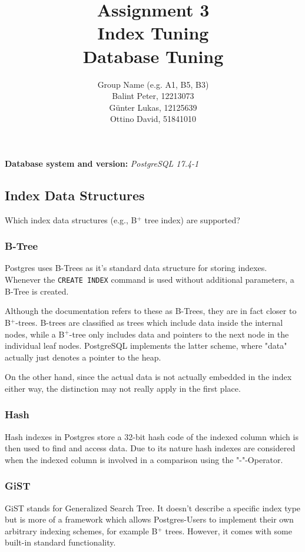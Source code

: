 \documentclass[11pt]{scrartcl}
\title{
  \textbf{\large Assignment 3} \\
  Index Tuning \\
  {\large Database Tuning}}
\author{
  Group Name (e.g. A1, B5, B3) \\
  \large Balint Peter, 12213073 \\
  \large Günter Lukas, 12125639 \\
  \large Ottino David, 51841010
}
\begin{document}
\maketitle

\textbf{Database system and version:} \emph{PostgreSQL 17.4-1}

\subsection{Index Data Structures}

Which index data structures (e.g., B$^+$ tree index) are supported?

\subsubsection{B-Tree}
Postgres uses B-Trees as it's standard data structure for storing indexes. Whenever the \texttt{CREATE INDEX} command is used without additional parameters, a B-Tree is created.

Although the documentation refers to these as B-Trees, they are in fact closer to B$^+$-trees. B-trees are classified as trees which include data inside the internal nodes, while a B$^+$-tree only includes data and pointers to the next node in the individual leaf nodes.  PostgreSQL implements the latter scheme, where "data" actually just denotes a pointer to the heap.

On the other hand, since the actual data is not actually embedded in the index either way, the distinction may not really apply in the first place. 

\subsubsection{Hash}
Hash indexes in Postgres store a 32-bit hash code of the indexed column which is then used to find and access data. Due to its nature hash indexes are considered when the indexed column is involved in a comparison using the "-"-Operator.

\subsubsection{GiST}
GiST stands for Generalized Search Tree. It doesn't describe a specific index type but is more of a framework which allows Postgres-Users to implement their own arbitrary indexing schemes, for example B$^+$ trees. However, it comes with some built-in standard functionality.
\end{document}
